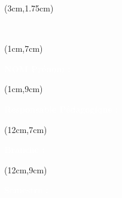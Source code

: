 \begin{titlepage}
    \thispagestyle{empty}

    

    \begin{textblock*}{15cm}(3cm,1.75cm)
        \begin{LARGE}
            \makeatletter
            \justifying

            \begin{center}
                \textbf{\textcolor{white}{\jobposition}}
                \\
                \textbf{\textcolor{white}{\thetitle}}
            \end{center}

            \makeatother
        \end{LARGE}
    \end{textblock*}

    \begin{textblock*}{10cm}(1cm,7cm)
        \raggedright
        \large
        \textbf{\textcolor{white}{NOM Prénom :}}
        \\
        \textbf{\textcolor{white}{\theauthor}}
    \end{textblock*}

    \begin{textblock*}{10cm}(1cm,9cm)
        \raggedright
        \large
        \textbf{\textcolor{white}{Responsable Pédagogique :}}
        \\
        \textbf{\textcolor{white}{\theRPeda}}
    \end{textblock*}


    \begin{textblock*}{10cm}(12cm,7cm)
        \raggedright
        \large
        \textbf{\textcolor{white}{Branche :}}
        \\
        \begin{raggedleft}
            \textcolor{white}{\theUE}
        \end{raggedleft}
    \end{textblock*}

    \begin{textblock*}{10cm}(12cm,9cm)
        \large
        \raggedright
        \textbf{\textcolor{white}{Semestre :}}
        \\
        \textcolor{white}{\theSemestre}
    \end{textblock*}


\end{titlepage}
